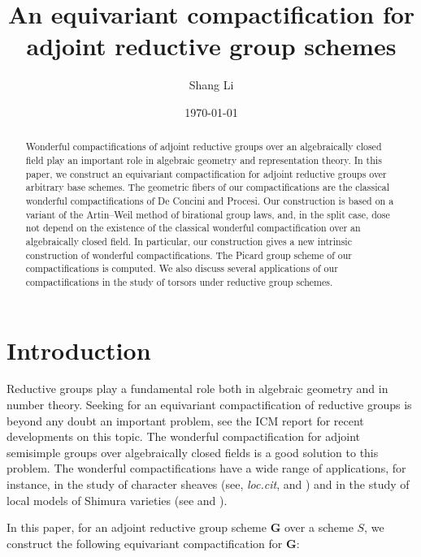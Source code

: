 \documentclass[11pt, reqno]{amsart}
\title{An equivariant compactification for adjoint reductive group schemes}
\author{Shang Li}
\date{\today}
\theoremstyle{plain}
\theoremstyle{definition}
\begin{document}
\setcounter{tocdepth}{1}

\maketitle

\begin{abstract}
    Wonderful compactifications of adjoint reductive groups over an algebraically closed field play an important role in algebraic geometry and representation theory. In this paper, we construct an equivariant compactification for adjoint reductive groups over arbitrary base schemes. The geometric fibers of our compactifications are the classical wonderful compactifications of De Concini and Procesi. Our construction is based on a variant of the Artin--Weil method of birational group laws, and, in the split case, dose not depend on the existence of the classical wonderful compactification over an algebraically closed field. In particular, our construction gives a new intrinsic construction of wonderful compactifications. The Picard group scheme of our compactifications is computed. We also discuss several applications of our compactifications in the study of torsors under reductive group schemes.
\end{abstract}

\tableofcontents

\pagestyle{plain}

\section{Introduction}

Reductive groups play a fundamental role both in algebraic geometry and in number theory. Seeking for an equivariant compactification of reductive groups is beyond any doubt an important problem, see the ICM report \cite{SpringerICM} for recent developments on this topic. The wonderful compactification for adjoint semisimple groups over algebraically closed fields is a good solution to this problem. The wonderful compactifications have a wide range of applications, for instance, in the study of character sheaves (see, \emph{loc.cit}, \cite{Ginsburg} and \cite{Lusztigparabolicsheaves}) and in the study of local models of Shimura varieties (see \cite{XuhuaHelocalmodel} and \cite[Section~8]{surveylocalmodel}).

In this paper, for an adjoint reductive group scheme $\mathbf{G}$ over a scheme $S$, we construct the following equivariant compactification for $\mathbf{G}:$
\end{document}
